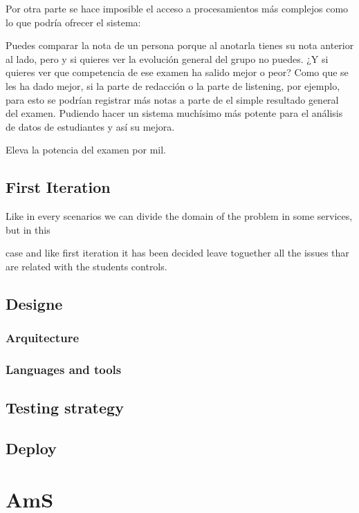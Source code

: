 \documentclass[oneside,english,titlepage]{scrbook}
\begin{document}
Por otra parte se hace imposible el acceso a procesamientos más complejos como lo que podría ofrecer el sistema:

Puedes comparar la nota de un persona porque al anotarla tienes su nota anterior al lado, pero y si quieres ver la evolución general del grupo no puedes.
¿Y si quieres ver que competencia de ese examen ha salido mejor o peor? Como que se les ha dado mejor, si la parte de redacción o la parte de listening, por ejemplo, para esto se podrían registrar más notas a parte de el simple resultado general del examen. Pudiendo hacer un sistema muchísimo más
potente para el análisis de datos de estudiantes y así su mejora.

Eleva la potencia del examen por mil.






\subsection{First Iteration}

Like in every scenarios we can divide the domain of the problem in
some services, but in this

case and like first iteration it has been decided leave toguether
all the issues thar are related with the students controls.

\subsection{Designe}

\subsubsection{Arquitecture}

\subsubsection{Languages and tools}

\subsection{Testing strategy}

\subsection{Deploy}

\section{AmS}
\end{document}

